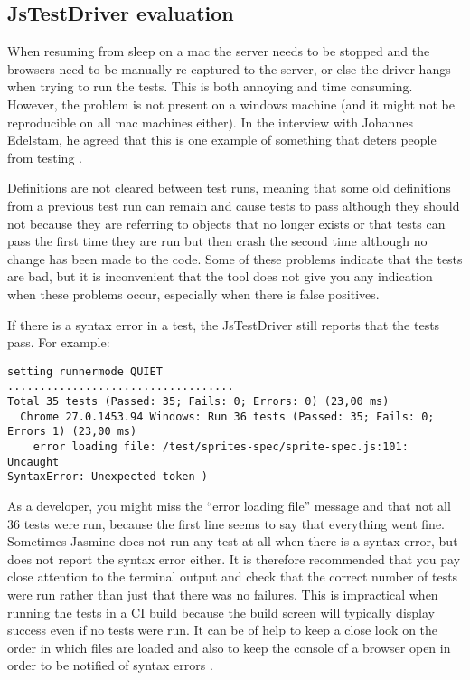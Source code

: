 \documentclass[11pt]{article}
\begin{document}
\subsection{JsTestDriver evaluation}

When resuming from sleep on a mac the server needs to be stopped and the browsers need to be manually re-captured to the server, or else the driver hangs when trying to run the tests. This is both annoying and time consuming. However, the problem is not present on a windows machine (and it might not be reproducible on all mac machines either). In the interview with Johannes Edelstam, he agreed that this is one example of something that deters people from testing \cite{Edelstam}.

Definitions are not cleared between test runs, meaning that some old definitions from a previous test run can remain and cause tests to pass although they should not because they are referring to objects that no longer exists or that tests can pass the first time they are run but then crash the second time although no change has been made to the code. Some of these problems indicate that the tests are bad, but it is inconvenient that the tool does not give you any indication when these problems occur, especially when there is false positives.

If there is a syntax error in a test, the JsTestDriver still reports that the tests pass. For example:

\begin{verbatim}
setting runnermode QUIET
...................................
Total 35 tests (Passed: 35; Fails: 0; Errors: 0) (23,00 ms)
  Chrome 27.0.1453.94 Windows: Run 36 tests (Passed: 35; Fails: 0;
Errors 1) (23,00 ms)
    error loading file: /test/sprites-spec/sprite-spec.js:101: Uncaught
SyntaxError: Unexpected token )
\end{verbatim}

As a developer, you might miss the ``error loading file'' message and that not all 36 tests were run, because the first line seems to say that everything went fine. Sometimes Jasmine does not run any test at all when there is a syntax error, but does not report the syntax error either. It is therefore recommended that you pay close attention to the terminal output and check that the correct number of tests were run rather than just that there was no failures. This is impractical when running the tests in a CI build because the build screen will typically display success even if no tests were run. It can be of help to keep a close look on the order in which files are loaded and also to keep the console of a browser open in order to be notified of syntax errors \cite{MikeJansen}.
\end{document}
